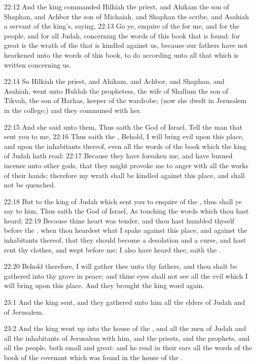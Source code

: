 22:12 And the king commanded Hilkiah the priest, and Ahikam the son of Shaphan, and Achbor the son of Michaiah, and Shaphan the scribe, and Asahiah a servant of the king's, saying, 22:13 Go ye, enquire of the \LORD for me, and for the people, and for all Judah, concerning the words of this book that is found: for great is the wrath of the \LORD that is kindled against us, because our fathers have not hearkened unto the words of this book, to do according unto all that which is written concerning us.

22:14 So Hilkiah the priest, and Ahikam, and Achbor, and Shaphan, and Asahiah, went unto Huldah the prophetess, the wife of Shallum the son of Tikvah, the son of Harhas, keeper of the wardrobe; (now she dwelt in Jerusalem in the college;) and they communed with her.

22:15 And she said unto them, Thus saith the \LORD God of Israel, Tell the man that sent you to me, 22:16 Thus saith the \LORD, Behold, I will bring evil upon this place, and upon the inhabitants thereof, even all the words of the book which the king of Judah hath read: 22:17 Because they have forsaken me, and have burned incense unto other gods, that they might provoke me to anger with all the works of their hands; therefore my wrath shall be kindled against this place, and shall not be quenched.

22:18 But to the king of Judah which sent you to enquire of the \LORD, thus shall ye say to him, Thus saith the \LORD God of Israel, As touching the words which thou hast heard; 22:19 Because thine heart was tender, and thou hast humbled thyself before the \LORD, when thou heardest what I spake against this place, and against the inhabitants thereof, that they should become a desolation and a curse, and hast rent thy clothes, and wept before me; I also have heard thee, saith the \LORD.

22:20 Behold therefore, I will gather thee unto thy fathers, and thou shalt be gathered into thy grave in peace; and thine eyes shall not see all the evil which I will bring upon this place. And they brought the king word again.

23:1 And the king sent, and they gathered unto him all the elders of Judah and of Jerusalem.

23:2 And the king went up into the house of the \LORD, and all the men of Judah and all the inhabitants of Jerusalem with him, and the priests, and the prophets, and all the people, both small and great: and he read in their ears all the words of the book of the covenant which was found in the house of the \LORD.

